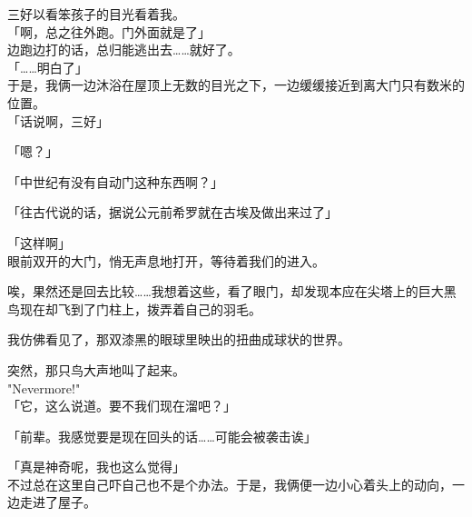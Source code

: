 三好以看笨孩子的目光看着我。\\

「啊，总之往外跑。门外面就是了」\\

边跑边打的话，总归能逃出去……就好了。\\

「……明白了」\\

于是，我俩一边沐浴在屋顶上无数的目光之下，一边缓缓接近到离大门只有数米的位置。\\

「话说啊，三好」

「嗯？」

「中世纪有没有自动门这种东西啊？」

「往古代说的话，据说公元前希罗就在古埃及做出来过了」

「这样啊」\\

眼前双开的大门，悄无声息地打开，等待着我们的进入。

唉，果然还是回去比较……我想着这些，看了眼门，却发现本应在尖塔上的巨大黑鸟现在却飞到了门柱上，拨弄着自己的羽毛。

我仿佛看见了，那双漆黑的眼球里映出的扭曲成球状的世界。

突然，那只鸟大声地叫了起来。\\

"Nevermore!"\\

「它，这么说道。要不我们现在溜吧？」

「前辈。我感觉要是现在回头的话……可能会被袭击诶」

「真是神奇呢，我也这么觉得」\\

不过总在这里自己吓自己也不是个办法。于是，我俩便一边小心着头上的动向，一边走进了屋子。\\
